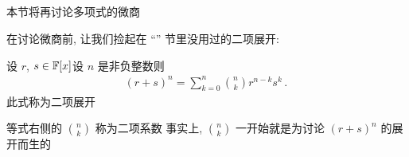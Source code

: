 \subsection*{\DerivativesRevisited}
\markright{\DerivativesRevisited}

本节将再讨论多项式的微商\period

在讨论微商前, 让我们捡起在 ``\GeneralizedBinomialCoefficients '' 节里没用过的二项展开:

\begin{proposition}
    设 $r$, $s \in \mathbb{F}[x]$\period 设 $n$ 是非负整数\period 则
    \begin{align*}
        (r + s)^{n} = \sum_{k = 0}^{n} \binom{n}{k} r^{n - k} s^{k} \period
    \end{align*}
    此式称为二项展开\period
\end{proposition}

\begin{remark}
    等式右侧的 $\binom{n}{k}$ 称为二项系数 \period 事实上, $\binom{n}{k}$ 一开始就是为讨论 $(r+s)^n$ 的展开而生的\period
\end{remark}

